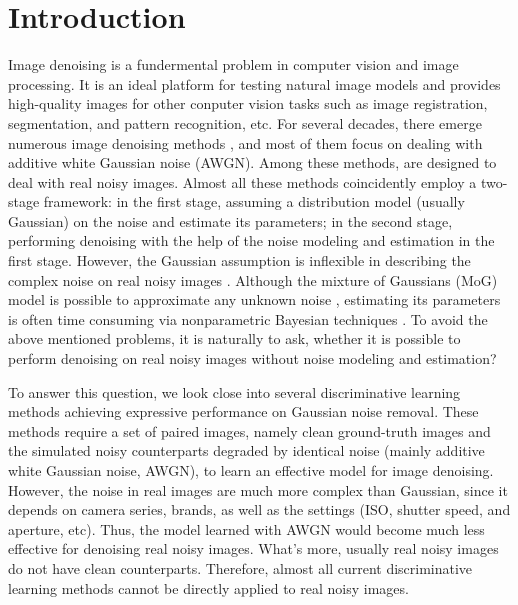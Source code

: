 \documentclass[10pt,twocolumn,letterpaper]{article}
\begin{document}
\section{Introduction}
Image denoising is a fundermental problem in computer vision and image processing. It is an ideal platform for testing natural image models and provides high-quality images for other conputer vision tasks such as image registration, segmentation, and pattern recognition, etc. For several decades, there emerge numerous image denoising methods \cite{nlm,foe,ksvd,bm3d,lssc,epll,burger2012image,wnnm,csf,pgpd,chen2015learning,fullyblind,rabie2005robust,Liu2008,almapg,noiseclinic,Zhu_2016_CVPR,crosschannel2016}, and most of them focus on dealing with additive white Gaussian noise (AWGN). Among these methods, \cite{fullyblind,rabie2005robust,Liu2008,almapg,noiseclinic,Zhu_2016_CVPR,crosschannel2016} are designed to deal with real noisy images. Almost all these methods coincidently employ a two-stage framework: in the first stage, assuming a distribution model (usually Gaussian) on the noise and estimate its parameters; in the second stage, performing denoising with the help of the noise modeling and estimation in the first stage. However, the Gaussian assumption is inflexible in describing the complex noise on real noisy images \cite{Liu2008,crosschannel2016}. Although the mixture of Gaussians (MoG) model is possible to approximate any unknown noise \cite{Zhu_2016_CVPR}, estimating its parameters is often time consuming via nonparametric Bayesian techniques \cite{Zhu_2016_CVPR} \cite{Bishop}. To avoid the above mentioned problems, it is naturally to ask, whether it is possible to perform denoising on real noisy images without noise modeling and estimation? 

To answer this question, we look close into several discriminative learning methods \cite{burger2012image,csf,chen2015learning} achieving expressive performance on Gaussian noise removal. These methods require a set of paired images, namely clean ground-truth images and the simulated noisy counterparts degraded by identical noise (mainly additive white Gaussian noise, AWGN), to learn an effective model for image denoising. However, the noise in real images are much more complex than Gaussian, since it depends on camera series, brands, as well as the settings (ISO, shutter speed, and aperture, etc). Thus, the model learned with AWGN would become much less effective for denoising real noisy images. What's more, usually real noisy images do not have clean counterparts. Therefore, almost all current discriminative learning methods cannot be directly applied to real noisy images.
\end{document}
